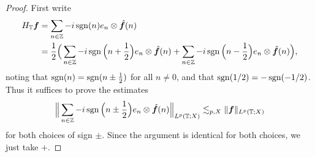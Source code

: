   \begin{proof}
    First write
    \begin{equation*}
      \begin{aligned}
        H_{\mathbb{T}} \bm{f}
        &= \sum_{n \in \mathbb{Z}} -i \operatorname{sgn}(n) e_{n} \otimes \hat{\bm{f}}(n) \\
        &= \frac{1}{2} \Big(
        \sum_{n \in \mathbb{Z}} -i \operatorname{sgn}\Big(n+\frac{1}{2}\Big) e_{n} \otimes \hat{\bm{f}}(n)
        + \sum_{n \in \mathbb{Z}} -i \operatorname{sgn}\Big(n-\frac{1}{2}\Big) e_{n} \otimes \hat{\bm{f}}(n) \Big),
      \end{aligned}
    \end{equation*}
    noting that $\operatorname{sgn}(n) = \operatorname{sgn}(n \pm \frac{1}{2})$ for all $n \neq 0$, and that $\operatorname{sgn}(1/2) = -\operatorname{sgn}(-1/2)$.
    Thus it suffices to prove the estimates
    \begin{equation*}
      \Big\| \sum_{n \in \mathbb{Z}} -i \operatorname{sgn}\Big(n\pm\frac{1}{2}\Big) e_{n} \otimes \hat{\bm{f}}(n) \Big\|_{L^p(\mathbb{T};X)} \lesssim_{p,X} \|\bm{f}\|_{L^p(\mathbb{T};X)}
    \end{equation*}
    for both choices of sign $\pm$.
    Since the argument is identical for both choices, we just take $+$.
    

\end{proof}
